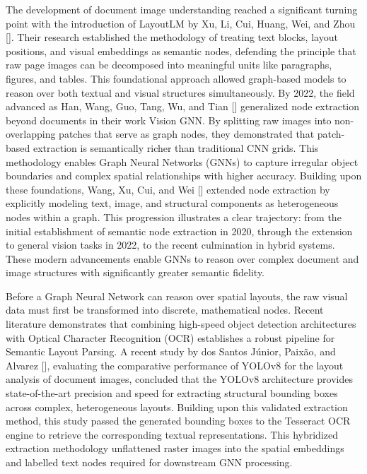 \begin{refsection}
The development of document image understanding reached a significant turning point with the introduction of LayoutLM by Xu, Li, Cui, Huang, Wei, and Zhou [\citeyear{Xu2020LayoutLM}]. Their research established the methodology of treating text blocks, layout positions, and visual embeddings as semantic nodes, defending the principle that raw page images can be decomposed into meaningful units like paragraphs, figures, and tables. This foundational approach allowed graph-based models to reason over both textual and visual structures simultaneously. By 2022, the field advanced as Han, Wang, Guo, Tang, Wu, and Tian [\citeyear{Han2022VisionGNN}] generalized node extraction beyond documents in their work Vision GNN. By splitting raw images into non-overlapping patches that serve as graph nodes, they demonstrated that patch-based extraction is semantically richer than traditional CNN grids. This methodology enables Graph Neural Networks (GNNs) to capture irregular object boundaries and complex spatial relationships with higher accuracy. Building upon these foundations, Wang, Xu, Cui, and Wei [\citeyear{Wang2023Graphical}] extended node extraction by explicitly modeling text, image, and structural components as heterogeneous nodes within a graph. This progression illustrates a clear trajectory: from the initial establishment of semantic node extraction in 2020, through the extension to general vision tasks in 2022, to the recent culmination in hybrid systems. These modern advancements enable GNNs to reason over complex document and image structures with significantly greater semantic fidelity.

Before a Graph Neural Network can reason over spatial layouts, the raw visual data must first be transformed into discrete, mathematical nodes. Recent literature demonstrates that combining high-speed object detection architectures with Optical Character Recognition (OCR) establishes a robust pipeline for Semantic Layout Parsing. A recent study by dos Santos Júnior, Paixão, and Alvarez [\citeyear{dosSantosJunior2025}], evaluating the comparative performance of YOLOv8 for the layout analysis of document images, concluded that the YOLOv8 architecture provides state-of-the-art precision and speed for extracting structural bounding boxes across complex, heterogeneous layouts. Building upon this validated extraction method, this study passed the generated bounding boxes to the Tesseract OCR engine to retrieve the corresponding textual representations. This hybridized extraction methodology unflattened raster images into the spatial embeddings and labelled text nodes required for downstream GNN processing.


\end{refsection}
